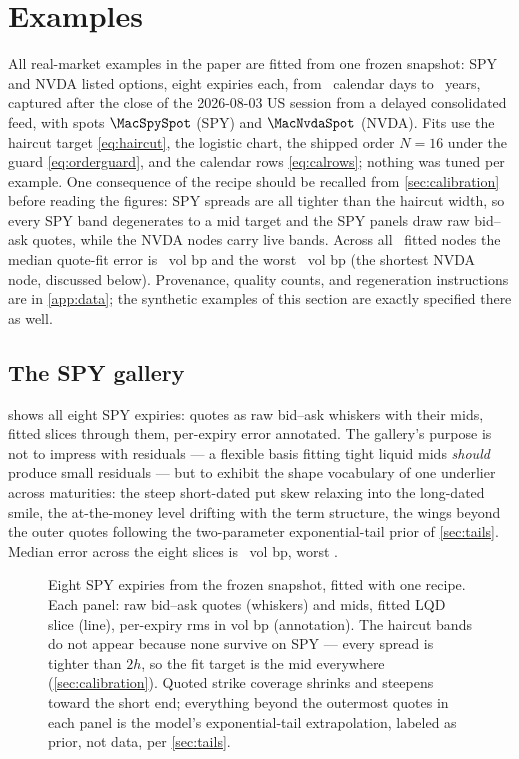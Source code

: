 \section{Examples}
\label{sec:examples}

All real-market examples in the paper are fitted from one frozen
snapshot: SPY and NVDA listed options, eight expiries each, from
\MacNvdaOneDayDays\ calendar days to \MacNvdaLongTYears\ years, captured
after the close of the 2026-08-03 US session from a delayed consolidated
feed, with spots $\MacSpySpot$ (SPY) and $\MacNvdaSpot$ (NVDA).  Fits
use the haircut target \eqref{eq:haircut}, the logistic chart, the
shipped order $N=16$ under the guard \eqref{eq:orderguard}, and the
calendar rows \eqref{eq:calrows}; nothing was tuned per example.  One
consequence of the recipe should be recalled from
\cref{sec:calibration} before reading the figures: SPY spreads are all
tighter than the haircut width, so every SPY band degenerates to a mid
target and the SPY panels draw raw bid--ask quotes, while the NVDA
nodes carry live bands.  Across all \MacSnapNodeCount\ fitted nodes the
median quote-fit error is \MacSnapMedianRmsBp\ vol bp and the worst
\MacSnapWorstRmsBp\ vol bp (the shortest NVDA node, discussed below).
Provenance, quality counts, and regeneration instructions are in
\cref{app:data}; the synthetic examples of this section are exactly
specified there as well.

\subsection{The SPY gallery}

 shows all eight SPY expiries: quotes as raw
bid--ask whiskers with their mids, fitted slices through them,
per-expiry error annotated.  The gallery's purpose is not to impress
with residuals --- a flexible basis fitting tight liquid mids
\emph{should} produce small residuals --- but to exhibit the shape
vocabulary of one underlier across maturities:
the steep short-dated put skew relaxing into the long-dated smile, the
at-the-money level drifting with the term structure, the wings beyond
the outer quotes following the two-parameter exponential-tail prior of
\cref{sec:tails}.  Median error across the eight slices is
\MacSpyGalleryMedianRmsBp\ vol bp, worst \MacSpyGalleryWorstRmsBp.

\begin{figure}[htbp]
\centering
{}
\caption{Eight SPY expiries from the frozen snapshot, fitted with one
recipe.  Each panel: raw bid--ask quotes (whiskers) and mids, fitted
LQD slice (line), per-expiry rms in vol bp (annotation).  The haircut
bands do not appear because none survive on SPY --- every spread is
tighter than $2h$, so the fit target is the mid everywhere
(\cref{sec:calibration}).  Quoted strike coverage shrinks and steepens
toward the short end; everything beyond the outermost quotes in each
panel is the model's exponential-tail extrapolation, labeled as prior,
not data, per \cref{sec:tails}.}
\label{fig:spy_gallery}
\end{figure}

